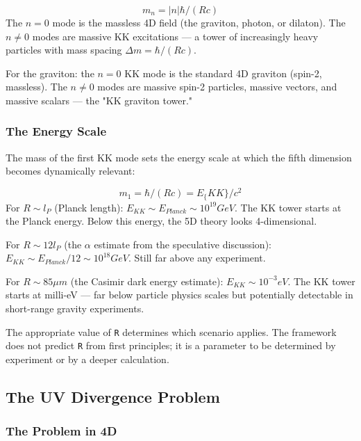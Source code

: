 \documentclass[aps,prd,preprint,superscriptaddress,longbibliography,floatfix]{revtex4-2}
\theoremstyle{remark}
\begin{document}
\begin{equation}
    m_n = |n|\hbar / (Rc)
\end{equation}
The $n = 0$ mode is the massless 4D field (the graviton, photon, or dilaton). The $n \neq 0$ modes are massive KK excitations --- a tower of increasingly heavy particles with mass spacing $\Delta m = \hbar/(Rc)$.

For the graviton: the $n = 0$ KK mode is the standard 4D graviton (spin-2, massless). The $n \neq 0$ modes are massive spin-2 particles, massive vectors, and massive scalars --- the "KK graviton tower."


\subsubsection{The Energy Scale}

The mass of the first KK mode sets the energy scale at which the fifth dimension becomes dynamically relevant:


\begin{equation}
    m_{1} = \hbar/(Rc) = E_\{KK\}/c^{2}
\end{equation}
For $R \sim  l_P$ (Planck length): $E_{KK} \sim  E_{Planck} \sim  10^{19} GeV$. The KK tower starts at the Planck energy. Below this energy, the 5D theory looks 4-dimensional.

For $R \sim  12 l_P$ (the $\alpha$ estimate from the speculative discussion): $E_{KK} \sim  E_{Planck}/12 \sim  10^{18} GeV$. Still far above any experiment.

For $R \sim  85 \mu m$ (the Casimir dark energy estimate): $E_{KK} \sim  10^{-3} eV$. The KK tower starts at milli-eV --- far below particle physics scales but potentially detectable in short-range gravity experiments.

The appropriate value of \texttt{R} determines which scenario applies. The framework does not predict \texttt{R} from first principles; it is a parameter to be determined by experiment or by a deeper calculation.



\subsection{The UV Divergence Problem}


\subsubsection{The Problem in 4D}
\end{document}
